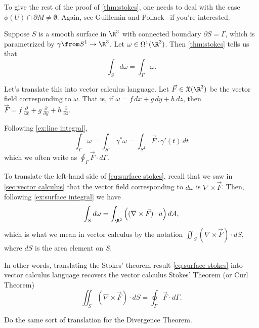 To give the rest of the proof of \cref{thm:stokes}, one needs to deal with the case $\phi(U) \cap \partial M \neq \emptyset$. Again, see Guillemin and Pollack~\cite{guilleminDifferentialTopology2010} if you're interested.

\begin{example}
	Suppose $S$ is a smooth surface in $\R^3$ with connected boundary $\partial S = \Gamma$, which is parametrized by $\gamma \from S^1 \to \R^3$. Let $\omega \in \Omega^1(\R^3)$. Then \cref{thm:stokes} tells us that
	\begin{equation}\label{eq:surface stokes}
		\int_S d\omega = \int_\Gamma \omega.
	\end{equation}
	
	Let's translate this into vector calculus language. Let $\vec{F} \in \mathfrak{X}(\R^3)$ be the vector field corresponding to $\omega$. That is, if $\omega = f \, dx + g \, dy + h\, dz$, then $\vec{F} = f\,\frac{\partial}{\partial x} + g\, \frac{\partial}{\partial y} + h \, \frac{\partial}{\partial z}$. 
	
	Following \cref{ex:line integral},
	\[
		\int_\Gamma \omega = \int_{S^1} \gamma^\ast \omega = \int_{S^1} \vec{F} \cdot \gamma'(t)\, dt
	\]
	which we often write as $\oint_\Gamma \vec{F} \cdot d\Gamma$.
	
	To translate the left-hand side of \eqref{eq:surface stokes}, recall that we saw in \cref{sec:vector calculus} that the vector field corresponding to $d \omega$ is $\nabla \times \vec{F}$. Then, following \cref{ex:surface integral} we have
	\[
		\int_S d\omega = \int_{\R^2} \left((\nabla \times \vec{F}) \cdot u\right) dA,
	\]
	which is what we mean in vector calculus by the notation $\iint_S (\nabla \times\vec{F}) \cdot dS$, where $dS$ is the area element on $S$. 
	
	In other words, translating the Stokes' theorem result \eqref{eq:surface stokes} into vector calculus language recovers the vector calculus Stokes' Theorem (or Curl Theorem)
	\[
		\iint_S (\nabla \times\vec{F}) \cdot dS = \oint_\Gamma \vec{F} \cdot d\Gamma.
	\]
\end{example}

\begin{exercise}
	Do the same sort of translation for the Divergence Theorem.
\end{exercise}